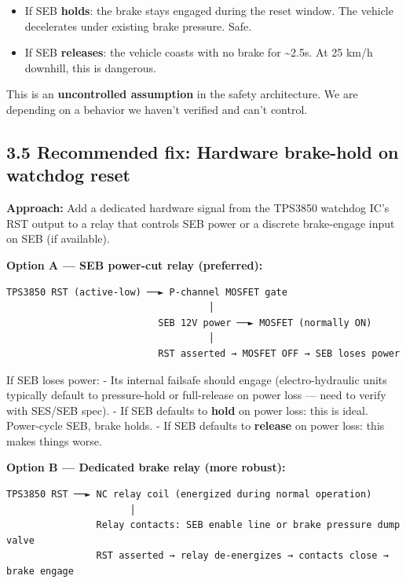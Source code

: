 \documentclass[12pt,a4paper,oneside]{report}
\providecommand{\tightlist}{\setlength{\itemsep}{0pt}\setlength{\parskip}{0pt}}
\begin{document}
\begin{itemize}
\tightlist
\item
  If SEB \textbf{holds}: the brake stays engaged during the reset window. The
  vehicle decelerates under existing brake pressure. Safe.
\item
  If SEB \textbf{releases}: the vehicle coasts with no brake for
  \textasciitilde2.5s. At 25 km/h downhill, this is dangerous.
\end{itemize}

This is an \textbf{uncontrolled assumption} in the safety architecture. We are
depending on a behavior we haven't verified and can't control.

\subsection{3.5 Recommended fix: Hardware brake-hold on watchdog
reset}\label{recommended-fix-hardware-brake-hold-on-watchdog-reset}

\textbf{Approach:} Add a dedicated hardware signal from the TPS3850 watchdog
IC's RST output to a relay that controls SEB power or a discrete brake-engage
input on SEB (if available).

\textbf{Option A --- SEB power-cut relay (preferred):}

\begin{verbatim}
TPS3850 RST (active-low) ──► P-channel MOSFET gate
                                    │
                           SEB 12V power ──► MOSFET (normally ON)
                                    │
                           RST asserted → MOSFET OFF → SEB loses power
\end{verbatim}

If SEB loses power: - Its internal failsafe should engage (electro-hydraulic
units typically default to pressure-hold or full-release on power loss --- need
to verify with SES/SEB spec). - If SEB defaults to \textbf{hold} on power loss:
this is ideal. Power-cycle SEB, brake holds. - If SEB defaults to
\textbf{release} on power loss: this makes things worse.

\textbf{Option B --- Dedicated brake relay (more robust):}

\begin{verbatim}
TPS3850 RST ──► NC relay coil (energized during normal operation)
                      │
                Relay contacts: SEB enable line or brake pressure dump valve
                RST asserted → relay de-energizes → contacts close → brake engage
\end{verbatim}
\end{document}
